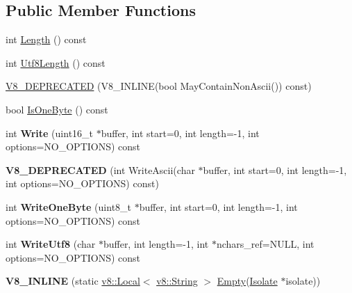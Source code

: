 \subsection*{Public Member Functions}
\begin{DoxyCompactItemize}
\item 
int \hyperlink{classv8_1_1_string_a94353cd764d2bf0cda141714c3c9eb6c}{Length} () const 
\item 
int \hyperlink{classv8_1_1_string_afb2bb302d3ffe807e66a0797d6ac4189}{Utf8\+Length} () const 
\item 
\hyperlink{classv8_1_1_string_ad89e28a155f3e6e4b768b1441a3257a8}{V8\+\_\+\+D\+E\+P\+R\+E\+C\+A\+T\+E\+D} (V8\+\_\+\+I\+N\+L\+I\+N\+E(bool May\+Contain\+Non\+Ascii()) const)
\item 
bool \hyperlink{classv8_1_1_string_a2e6771bd8fbd0e2d1fa01811d3e8c7dc}{Is\+One\+Byte} () const 
\item 
\hypertarget{classv8_1_1_string_ab1ee96f8adf969958faeff9eced9a56f}{}int {\bfseries Write} (uint16\+\_\+t $\ast$buffer, int start=0, int length=-\/1, int options=N\+O\+\_\+\+O\+P\+T\+I\+O\+N\+S) const \label{classv8_1_1_string_ab1ee96f8adf969958faeff9eced9a56f}

\item 
\hypertarget{classv8_1_1_string_abc6afc62be7afa9feda75d4db92313ce}{}{\bfseries V8\+\_\+\+D\+E\+P\+R\+E\+C\+A\+T\+E\+D} (int Write\+Ascii(char $\ast$buffer, int start=0, int length=-\/1, int options=N\+O\+\_\+\+O\+P\+T\+I\+O\+N\+S) const)\label{classv8_1_1_string_abc6afc62be7afa9feda75d4db92313ce}

\item 
\hypertarget{classv8_1_1_string_a61114324ef659345f04b2730679eb456}{}int {\bfseries Write\+One\+Byte} (uint8\+\_\+t $\ast$buffer, int start=0, int length=-\/1, int options=N\+O\+\_\+\+O\+P\+T\+I\+O\+N\+S) const \label{classv8_1_1_string_a61114324ef659345f04b2730679eb456}

\item 
\hypertarget{classv8_1_1_string_ad62145c723fa0ce55095223223263f41}{}int {\bfseries Write\+Utf8} (char $\ast$buffer, int length=-\/1, int $\ast$nchars\+\_\+ref=N\+U\+L\+L, int options=N\+O\+\_\+\+O\+P\+T\+I\+O\+N\+S) const \label{classv8_1_1_string_ad62145c723fa0ce55095223223263f41}

\item 
\hypertarget{classv8_1_1_string_afd7a2ae2b9625ae0f0cee18a4dd566f4}{}{\bfseries V8\+\_\+\+I\+N\+L\+I\+N\+E} (static \hyperlink{classv8_1_1_local}{v8\+::\+Local}$<$ \hyperlink{classv8_1_1_string}{v8\+::\+String} $>$ \hyperlink{classv8_1_1_string_a5f222b35243cdfc0bb2c12a300d62d11}{Empty}(\hyperlink{classv8_1_1_isolate}{Isolate} $\ast$isolate))\label{classv8_1_1_string_afd7a2ae2b9625ae0f0cee18a4dd566f4}


\end{DoxyCompactItemize}
